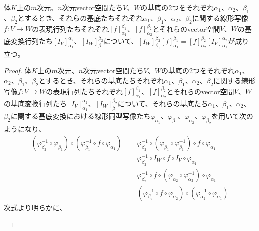 \documentclass[dvipdfmx]{jsarticle}
\begin{document}
\begin{thm}
\label{2.1.5.12}
体$K$上の$m$次元、$n$次元vector空間たち$V$、$W$の基底の2つをそれぞれ$\alpha_{1}$、$\alpha_{2}$、$\beta_{1}$、$\beta_{2}$とするとき、それらの基底たちそれぞれ$\alpha_{1}$、$\beta_{1}$、$\alpha_{2}$、$\beta_{2}$に関する線形写像$f:V \rightarrow W$の表現行列たちそれぞれ$[ f]^{\beta_{1}}_{\alpha_{1}}$、$[ f]^{\beta_{2}}_{\alpha_{2}}$とそれらのvector空間$V$、$W$の基底変換行列たち$\left[ I_{V} \right]^{\alpha_{2}}_{\alpha_{1}}$、$\left[ I_{W} \right]^{\beta_{2}}_{\beta_{1}}$について、$\left[ I_{W} \right]^{\beta_{2}}_{\beta_{1}}[ f]^{\beta_{1}}_{\alpha_{1}} = [ f]^{\beta_{2}}_{\alpha_{2}}\left[ I_{V} \right]^{\alpha_{2}}_{\alpha_{1}}$が成り立つ。
\end{thm}
\begin{proof}
体$K$上の$m$次元、$n$次元vector空間たち$V$、$W$の基底の2つをそれぞれ$\alpha_{1}$、$\alpha_{2}$、$\beta_{1}$、$\beta_{2}$とするとき、それらの基底たちそれぞれ$\alpha_{1}$、$\beta_{1}$、$\alpha_{2}$、$\beta_{2}$に関する線形写像$f:V \rightarrow W$の表現行列たちそれぞれ$[ f]^{\beta_{1}}_{\alpha_{1}}$、$[ f]^{\beta_{2}}_{\alpha_{2}}$とそれらのvector空間$V$、$W$の基底変換行列たち$\left[ I_{V} \right]^{\alpha_{2}}_{\alpha_{1}}$、$\left[ I_{W} \right]^{\beta_{2}}_{\beta_{1}}$について、それらの基底たち$\alpha_{1}$、$\beta_{1}$、$\alpha_{2}$、$\beta_{2}$に関する基底変換における線形同型写像たち$\varphi_{\alpha_{1}}$、$\varphi_{\beta_{1}}$、$\varphi_{\alpha_{2}}$、$\varphi_{\beta_{2}}$を用いて次のようになり、
\begin{align*}
\left( \varphi_{\beta_{2}}^{- 1} \circ \varphi_{\beta_{1}} \right) \circ \left( \varphi_{\beta_{1}}^{- 1} \circ f \circ \varphi_{\alpha_{1}} \right) &= \varphi_{\beta_{2}}^{- 1} \circ \left( \varphi_{\beta_{1}} \circ \varphi_{\beta_{1}}^{- 1} \right) \circ f \circ \varphi_{\alpha_{1}}\\
&= \varphi_{\beta_{2}}^{- 1} \circ I_{W} \circ f \circ I_{V} \circ \varphi_{\alpha_{1}}\\
&= \varphi_{\beta_{2}}^{- 1} \circ f \circ \left( \varphi_{\alpha_{2}} \circ \varphi_{\alpha_{2}}^{- 1} \right) \circ \varphi_{\alpha_{1}}\\
&= \left( \varphi_{\beta_{2}}^{- 1} \circ f \circ \varphi_{\alpha_{2}} \right) \circ \left( \varphi_{\alpha_{2}}^{- 1} \circ \varphi_{\alpha_{1}} \right)
\end{align*}
次式より明らかに、
\begin{center}
  \begin{tikzpicture}[auto]


\end{tikzpicture}
\end{center}
\end{proof}
\end{document}
